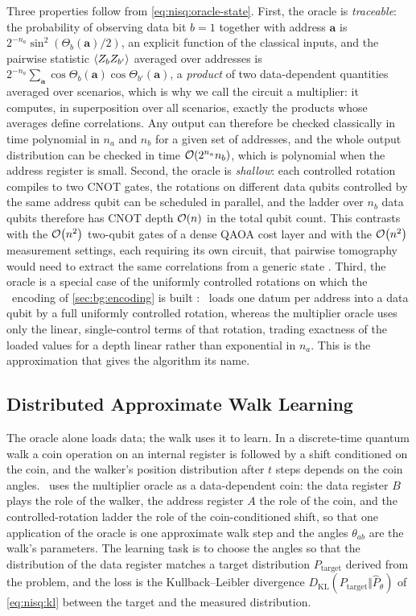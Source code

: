 Three properties follow from \cref{eq:nisq:oracle-state}. First, the oracle is \emph{traceable}: the probability of observing data bit $b=1$ together with address $\bm{a}$ is $2^{-n_{a}}\sin^{2}(\Theta_{b}(\bm{a})/2)$, an explicit function of the classical inputs, and the pairwise statistic $\expval{Z_{b}Z_{b'}}$ averaged over addresses is $2^{-n_{a}}\sum_{\bm{a}}\cos\Theta_{b}(\bm{a})\cos\Theta_{b'}(\bm{a})$, a \emph{product} of two data-dependent quantities averaged over scenarios, which is why we call the circuit a multiplier: it computes, in superposition over all scenarios, exactly the products whose averages define correlations. Any output can therefore be checked classically in time polynomial in $n_{a}$ and $n_{b}$ for a given set of addresses, and the whole output distribution can be checked in time $\mathcal{O}\!\left(2^{n_{a}}n_{b}\right)$, which is polynomial when the address register is small. Second, the oracle is \emph{shallow}: each controlled rotation compiles to two CNOT gates, the rotations on different data qubits controlled by the same address qubit can be scheduled in parallel, and the ladder over $n_{b}$ data qubits therefore has CNOT depth $\mathcal{O}\!\left(n\right)$ in the total qubit count. This contrasts with the $\mathcal{O}\!\left(n^{2}\right)$ two-qubit gates of a dense QAOA cost layer and with the $\mathcal{O}\!\left(n^{2}\right)$ measurement settings, each requiring its own circuit, that pairwise tomography would need to extract the same correlations from a generic state \cite{huang2020shadows}. Third, the oracle is a special case of the uniformly controlled rotations \cite{mottonen2004ucr} on which the \qcrank\ encoding of \cref{sec:bg:encoding} is built \cite{balewski2024qcrank}: \qcrank\ loads one datum per address into a data qubit by a full uniformly controlled rotation, whereas the multiplier oracle uses only the linear, single-control terms of that rotation, trading exactness of the loaded values for a depth linear rather than exponential in $n_{a}$. This is the approximation that gives the algorithm its name.

\subsection{Distributed Approximate Walk Learning}\label{sec:nisq:walk}

The oracle alone loads data; the walk uses it to learn. In a discrete-time quantum walk \cite{childs2009quantumwalk} a coin operation on an internal register is followed by a shift conditioned on the coin, and the walker's position distribution after $t$ steps depends on the coin angles. \qawa\ uses the multiplier oracle as a data-dependent coin: the data register $B$ plays the role of the walker, the address register $A$ the role of the coin, and the controlled-rotation ladder the role of the coin-conditioned shift, so that one application of the oracle is one approximate walk step and the angles $\theta_{ab}$ are the walk's parameters. The learning task is to choose the angles so that the distribution of the data register matches a target distribution $P_{\mathrm{target}}$ derived from the problem, and the loss is the Kullback--Leibler divergence $D_{\mathrm{KL}}(P_{\mathrm{target}}\Vert\hat{P}_{\theta})$ of \cref{eq:nisq:kl} between the target and the measured distribution.

